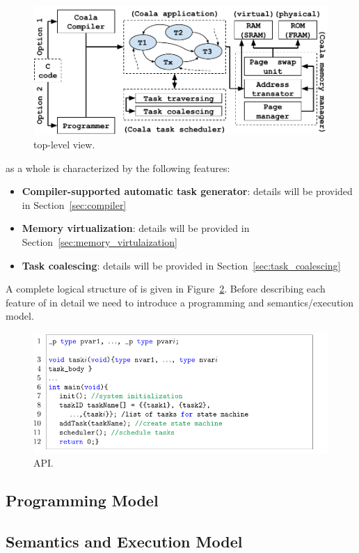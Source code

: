 \begin{figure}
	\centering
	\includegraphics[width=\columnwidth]{figures/viper_block_diagram}
	\caption{\sys top-level view.}
	\label{fig:system_overview}
\end{figure}

\sys as a whole is characterized by the following features:

\begin{itemize}
	\item \textbf{Compiler-supported automatic task generator}: details will be provided in Section~\ref{sec:compiler}
	\item \textbf{Memory virtualization}: details will be provided in Section~\ref{sec:memory_virtulaization}
	\item \textbf{Task coalescing}: details will be provided in Section~\ref{sec:task_coalescing}
\end{itemize}

A complete logical structure of \sys is given in Figure~\ref{fig:system_overview}. Before describing each feature of \sys in detail we need to introduce a programming and semantics/execution model.

\begin{figure}
	\centering
	\includegraphics[width=\columnwidth]{figures/taskification_example}
	\caption{\sys API.}
	\label{fig:system_overview}
\end{figure}


\subsection{Programming Model}
\label{sec:overview_programming_model}



\subsection{Semantics and Execution Model}
\label{sec:overview_semantics}

